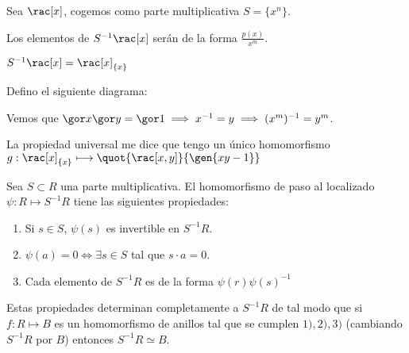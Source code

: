 	\begin{example}
		Sea $\rac[x]$, cogemos como parte multiplicativa $S=\{x^n\}$.

		Los elementos de $S^{-1}\rac[x]$ serán de la forma $\frac{p(x)}{x^m}$.

		\notacion $S^{-1}\rac[x]=\rac[x]_{\{x\}}$

		Defino el siguiente diagrama:

		Vemos que $\cls{x}\cls{y}=\cls{1} \implies x^{-1}=y \implies (x^m)^{-1}=y^m$.

		La propiedad universal me dice que tengo un único homomorfismo $g: \rac[x]_{\{x\}}\longmapsto \quot{\rac[x,y]}{\gen{xy-1}}$

	\end{example}

	\begin{theorem} \label{thm:PropsLocalizacion}
		Sea $S \subset R$ una parte multiplicativa. El homomorfismo de paso al localizado $\psi:R \longmapsto S^{-1}R$ tiene las siguientes propiedades:
		\begin{enumerate}
			\item Si $s\in S$, $\psi(s)$ es invertible en $S^{-1}R$.
			\item $\psi(a)=0 \Leftrightarrow \exists s \in S$ tal que $s\cdot a=0$.
			\item Cada elemento de $S^{-1}R$ es de la forma $\psi(r)\psi(s)^{-1}$
		\end{enumerate}

		Estas propiedades determinan completamente a $S^{-1}R$ de tal modo que si $f:R \longmapsto B$ es un homomorfismo de anillos tal que se cumplen $1), 2), 3)$ (cambiando $S^{-1}R$ por $B$) entonces $S^{-1}R \simeq B$.
	\end{theorem}

